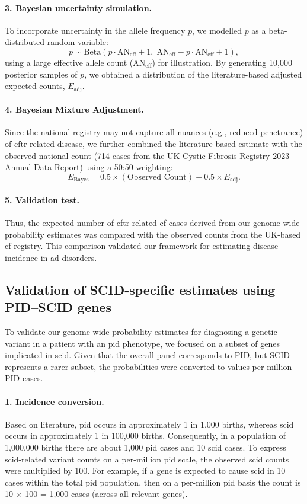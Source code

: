 \paragraph{3. Bayesian uncertainty simulation.}
To incorporate uncertainty in the allele frequency \( p \), we modelled \( p \) as a beta-distributed random variable:
\[
p \sim \mathrm{Beta}(p \cdot \text{AN}_{\text{eff}} + 1,\; \text{AN}_{\text{eff}} - p \cdot \text{AN}_{\text{eff}} + 1),
\]
using a large effective allele count (\(\text{AN}_{\text{eff}}\)) for illustration. 
By generating 10,000 posterior samples of \( p \), we obtained a distribution of the literature-based adjusted expected counts, \(E_{\text{adj}}\).

\paragraph{4. Bayesian Mixture Adjustment.}
Since the national registry may not capture all nuances (e.g., reduced penetrance) of \ac{cftr}-related disease, we further combined the literature-based estimate with the observed national count (714 cases from the UK Cystic Fibrosis Registry 2023 Annual Data Report) using a 50:50 weighting:
\[
E_{\text{Bayes}} = 0.5 \times (\text{Observed Count}) + 0.5 \times E_{\text{adj}}.
\]

\paragraph{5. Validation test.}
Thus, the expected number of \ac{cftr}-related \ac{cf} cases derived from our genome-wide probability estimates was compared with the observed counts from the UK-based \ac{cf} registry. This comparison validated our framework for estimating disease incidence in \ac{ad} disorders.

\subsection{Validation of SCID-specific estimates using PID–SCID genes}

To validate our genome-wide probability estimates for diagnosing a genetic variant in a patient with an \ac{pid} phenotype, we focused on a subset of genes implicated in \ac{scid}. Given that the overall panel corresponds to PID, but SCID represents a rarer subset, the probabilities were converted to values per million PID cases.

\paragraph{1. Incidence conversion.}
Based on literature, \ac{pid} occurs in approximately 1 in 1,000 births, whereas \ac{scid} occurs in approximately 1 in 100,000 births. 
Consequently, in a population of 1,000,000 births there are about 1,000 \ac{pid} cases and 10 \ac{scid} cases. 
To express \ac{scid}-related variant counts on a per-million \ac{pid}  scale, the observed \ac{scid} counts were multiplied by 100. 
For example, if a gene is expected to cause \ac{scid} in 10 cases within the total \ac{pid} population, then on a per-million \ac{pid}  basis the count is 10 × 100 = 1,000 cases (across all relevant genes).


